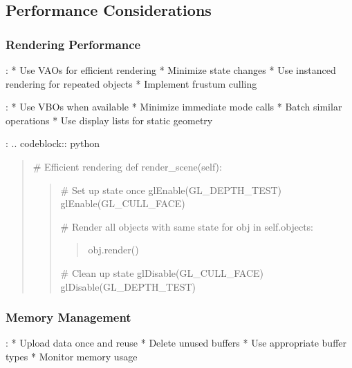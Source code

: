 \documentclass[a4paper,10pt,english,openany,oneside]{sphinxmanual}
\begin{document}
\subsection{Performance Considerations}
\label{\detokenize{development:performance-considerations}}

\subsubsection{Rendering Performance}
\label{\detokenize{development:rendering-performance}}
\sphinxAtStartPar
{}:
* Use VAOs for efficient rendering
* Minimize state changes
* Use instanced rendering for repeated objects
* Implement frustum culling

\sphinxAtStartPar
{}:
* Use VBOs when available
* Minimize immediate mode calls
* Batch similar operations
* Use display lists for static geometry

\sphinxAtStartPar
{}:
.. code\sphinxhyphen{}block:: python
\begin{quote}

\sphinxAtStartPar
\# Efficient rendering
def render\_scene(self):
\begin{quote}

\sphinxAtStartPar
\# Set up state once
glEnable(GL\_DEPTH\_TEST)
glEnable(GL\_CULL\_FACE)

\sphinxAtStartPar
\# Render all objects with same state
for obj in self.objects:
\begin{quote}
\begin{description}
\sphinxAtStartPar
obj.render()

\end{description}
\end{quote}

\sphinxAtStartPar
\# Clean up state
glDisable(GL\_CULL\_FACE)
glDisable(GL\_DEPTH\_TEST)
\end{quote}
\end{quote}


\subsubsection{Memory Management}
\label{\detokenize{development:memory-management}}
\sphinxAtStartPar
{}:
* Upload data once and reuse
* Delete unused buffers
* Use appropriate buffer types
* Monitor memory usage
\end{document}
